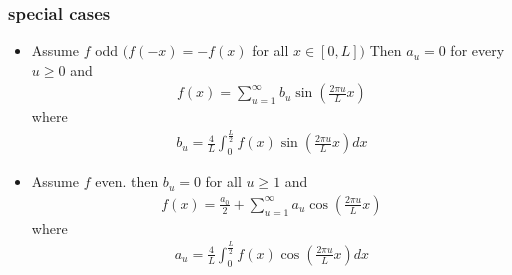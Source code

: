 \subsubsection{special cases }
\begin{itemize}
    \item Assume $f$ odd $(f(-x) = -f(x)$ for all $x \in [0,L])$ Then $a_u = 0$ for every $u \geq 0$ and 
    \begin{align*}
        f(x) = \sum_{u=1}^\infty b_u \sin(\frac{2 \pi u}{L}x)
    \end{align*} where 
    \begin{align*}
        b_u = \frac{4}{L}\int_0^{\frac{L}{2}} f(x)\sin(\frac{2\pi u}{L}x)dx
    \end{align*}
    \item Assume $f$ even. then $b_u=0$ for all $u \geq 1$ and 
    \begin{align*}
        f(x) = \frac{a_0}{2} + \sum_{u=1}^\infty a_u \cos(\frac{2 \pi u}{L}x)
    \end{align*} where 
    \begin{align*}
        a_u = \frac{4}{L}\int_0^{\frac{L}{2}} f(x) \cos(\frac{2 \pi u}{L}x) dx
    \end{align*}
\end{itemize}